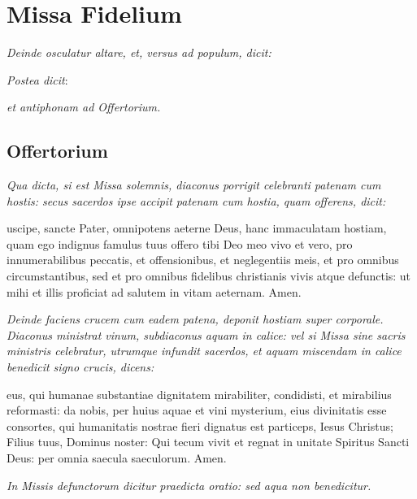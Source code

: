 {\let\cleardoublepage\clearpage\chapter{Missa Fidelium}}


\textit{Deinde osculatur altare, et, versus ad populum, dicit:}


\textit{Postea dicit}:


\textit{et antiphonam ad Offertorium.}

\section{Offertorium}



\textit{%
    Qua dicta, si est Missa solemnis, diaconus porrigit celebranti patenam cum
    hostis: secus sacerdos ipse accipit patenam cum hostia, quam offerens,
    dicit:
}

uscipe, sancte Pater, omnipotens aeterne Deus, hanc immaculatam
hostiam, quam ego indignus famulus tuus offero tibi Deo meo vivo et vero, pro
innumerabilibus peccatis, et offensionibus, et neglegentiis meis, et pro omnibus
circumstantibus, sed et pro omnibus fidelibus christianis vivis atque defunctis:
ut mihi et illis proficiat ad salutem in vitam aeternam.  Amen.

\textit{%
    Deinde faciens crucem cum eadem patena, deponit hostiam super corporale.
    Diaconus ministrat vinum, subdiaconus aquam in calice: vel si Missa sine
    sacris ministris celebratur, utrumque infundit sacerdos, et aquam miscendam
    in calice benedicit signo crucis, dicens:
}

eus, qui humanae substantiae dignitatem mirabiliter, condidisti, et
mirabilius reformasti: da nobis, per huius aquae et vini mysterium, eius
divinitatis esse consortes, qui humanitatis nostrae fieri dignatus est
particeps, Iesus Christus; Filius tuus, Dominus noster: Qui tecum vivit et
regnat in unitate Spiritus Sancti Deus: per omnia saecula saeculorum.  Amen.

\divisio

\textit{%
    In Missis defunctorum dicitur praedicta oratio: sed aqua non
    benedicitur.
}

